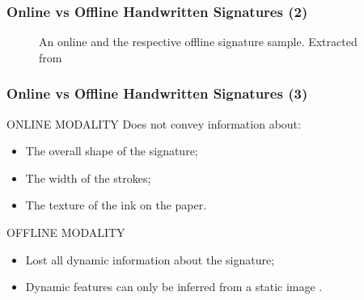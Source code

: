 \documentclass{beamer}
\begin{document}
\begin{frame}
\frametitle{Online vs Offline Handwritten Signatures (2)}

\begin{figure}[!htpb]

\centering
\hspace*{0.1in} %
\caption{An online and the respective offline signature sample. Extracted from \parencite{galbally2015line} }
\end{figure}
\end{frame}


\begin{frame}
\frametitle{Online vs Offline Handwritten Signatures (3)}


\begin{block}{ONLINE MODALITY}
Does not convey information about:
\begin{itemize}
\item The overall shape of the signature;
\item The width of the strokes;
\item The texture of the ink on the paper.
\end{itemize}
\end{block}

\pause

\begin{block}{OFFLINE MODALITY}
\begin{itemize}
\item Lost all dynamic information about the signature;
\item Dynamic features can only be inferred from a static image \parencite{nel2005estimating}. 
\end{itemize}



\end{block}

\end{frame}
\end{document}
